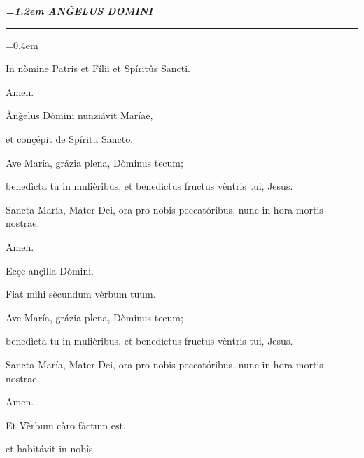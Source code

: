 \documentclass[twoside,10pt]{article}
\begin{document}
\pagestyle{empty}
{
  \begin{center}
  {\bfseries\itshape\large{}\font=1.2em \uppercase{anğelus domini}}
  \end{center}
}

{
  \begin{center}
  \rule{20em}{0.4pt}
  \end{center}
}

{
  \setlength\parindent{2em}\font=0.4em

  \bigskip

  \noindent In nòmine Patris et Fílii et Spíritûs Sancti.
  
  Amen.

  \bigskip

   Ànğelus Dòmini nunziávit Maríae,

  \smallskip

   et conçépit de Spíritu Sancto.

  \bigskip

  \noindent Ave María, grázia plena, Dòminus tecum;
  
  benedìcta tu in mulièribus, et benedìctus fructus vèntris tui, Jesus.

  Sancta María, Mater Dei, ora pro nobis peccatóribus, nunc in hora mortis nostrae.

  Amen.

  \bigskip

   Ecçe ançìlla Dòmini.

  \smallskip

   Fiat mìhi sècundum vèrbum tuum.

  \bigskip

  \noindent Ave María, grázia plena, Dòminus tecum;
  
  benedìcta tu in mulièribus, et benedìctus fructus vèntris tui, Jesus.

  Sancta María, Mater Dei, ora pro nobis peccatóribus, nunc in hora mortis nostrae.

  Amen.

  \bigskip

   Et Vèrbum càro fàctum est,

  \smallskip

   et habitávit in nobîs.

  \bigskip

}
\end{document}
